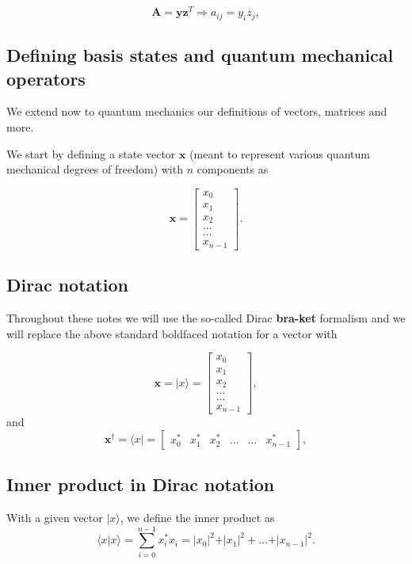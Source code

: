 \[
\bm{A}=  \bm{y}\bm{z}^T \Longrightarrow  a_{ij} = y_{i}z_{j},
\]

\subsection{Defining basis states and quantum mechanical operators}

We extend now to quantum mechanics our definitions of vectors, matrices and more.

We start by defining a state vector $\bm{x}$ (meant to represent
various quantum mechanical degrees of freedom) with $n$ components as

\[
\bm{x} = \begin{bmatrix} x_0\\ x_1 \\ x_2 \\ \dots \\ \dots \\ x_{n-1} \end{bmatrix}.
\]

\subsection{Dirac notation}

Throughout these notes we will use the so-called Dirac \textbf{bra-ket}
formalism and we will replace the above standard boldfaced notation
for a vector with

\[
\bm{x} = \vert x \rangle = \begin{bmatrix} x_0\\ x_1 \\ x_2 \\ \dots \\ \dots \\ x_{n-1} \end{bmatrix},
\]
and
\[
\bm{x}^{\dagger} = \langle x \vert = \begin{bmatrix} x_0^* & x_1^* & x_2^* & \dots & \dots & x_{n-1}^* \end{bmatrix},
\]

\subsection{Inner product in Dirac notation}

With a given vector $\vert x \rangle$, we define the inner product as
\[
\langle x \vert x\rangle = \sum_{i=0}^{n-1} x_i^*x_i=\vert x_0\vert^2+\vert x_1\vert ^2+\dots + \vert x_{n-1}\vert^2. 
\]

